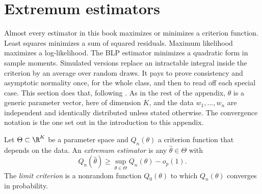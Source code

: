 \section{Extremum estimators}\label{sec:A-extremum}

Almost every estimator in this book maximizes or minimizes a criterion function. Least squares minimizes a sum of squared
residuals. Maximum likelihood maximizes a log-likelihood. The BLP estimator minimizes a quadratic form in sample moments.
Simulated versions replace an intractable integral inside the criterion by an average over random draws. It pays to
prove consistency and asymptotic normality once, for the whole class, and then to read off each special case. This
section does that, following \citet{NeweyMcFadden1994}. As in the rest of the appendix, $\theta$ is a generic parameter
vector, here of dimension $K$, and the data $w_1, \dots, w_n$ are independent and identically distributed unless stated
otherwise. The convergence notation is the one set out in the introduction to this appendix.

\begin{definition}\label{def:A-extremum}
Let $\Theta \subset \R^K$ be a parameter space and $Q_n(\theta)$ a criterion function that depends on the data. An
\emph{extremum estimator} is any $\hat\theta \in \Theta$ with
\begin{equation}\label{eq:A-extremum}
  Q_n(\hat\theta) \ge \sup_{\theta \in \Theta} Q_n(\theta) - o_p(1).
\end{equation}
The \emph{limit criterion} is a nonrandom function $Q_0(\theta)$ to which $Q_n(\theta)$ converges in probability.
\end{definition}

